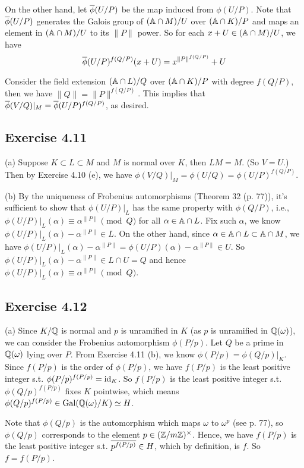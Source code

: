 \documentclass[../Marcus.tex]{subfiles}
\begin{document}
On the other hand, let $\ovl{\phi}(U/P)$ be the map induced from $\phi(U/P)$. Note that $\ovl{\phi}(U/P)$ generates the Galois group of $(\AA \cap M)/U$ over $(\AA \cap K)/P$ and maps an element in $(\AA \cap M)/U$ to its $\|P\|$ power. So for each $x+U \in (\AA \cap M)/U$, we have
$$
\ovl{\phi}(U/P)^{f(Q/P)}(x+U)=x^{\|P\|^{f(Q/P)}}+U
$$

Consider the field extension $(\AA \cap L)/Q$ over $(\AA \cap K)/P$ with degree $f(Q/P)$, then we have $\|Q\|=\|P\|^{f(Q/P)}$. This implies that $\ovl{\phi}(V/Q)|_M=\ovl{\phi}(U/P)^{f(Q/P)}$, as desired.

\subsection*{Exercise 4.11}

(a) Suppose $K\subset L\subset M$ and $M$ is normal over $K$, then $LM=M$. (So $V=U$.) Then by Exercise 4.10 (e), we have $\phi(V/Q)|_M=\phi(U/Q)=\phi(U/P)^{f(Q/P)}$.

(b) By the uniqueness of Frobenius automorphisms (Theorem 32 (p. 77)), it's sufficient to show that $\phi(U/P)|_L$ has the same property with $\phi(Q/P)$, i.e., $\phi(U/P)|_L(\alpha)\equiv\alpha^{\|P\|} \pmod{Q}$ for all $\alpha\in \AA \cap L$. Fix such $\alpha$, we know $\phi(U/P)|_L(\alpha)-\alpha^{\|P\|}\in L$. On the other hand, since $\alpha\in \AA \cap L \subset \AA \cap M$, we have $\phi(U/P)|_L(\alpha)-\alpha^{\|P\|}=\phi(U/P)(\alpha)-\alpha^{\|P\|}\in U$. So $\phi(U/P)|_L(\alpha)-\alpha^{\|P\|} \in L\cap U=Q$ and hence $\phi(U/P)|_L(\alpha)\equiv\alpha^{\|P\|} \pmod{Q}$.

\subsection*{Exercise 4.12}

(a) Since $K/\QQ$ is normal and $p$ is unramified in $K$ (as $p$ is unramified in $\QQ(\omega)$), we can consider the Frobenius automorphism $\phi(P/p)$. Let $Q$ be a prime in $\QQ(\omega)$ lying over $P$. From Exercise 4.11 (b), we know $\phi(P/p)=\phi(Q/p)|_K$. Since $f(P/p)$ is the order of $\phi(P/p)$, we have $f(P/p)$ is the least positive integer s.t. $\phi(P/p)^{f(P/p)}=\id_K$. So $f(P/p)$ is the least positive integer s.t. $\phi(Q/p)^{f(P/p)}$ fixes $K$ pointwise, which means $\phi(Q/p)^{f(P/p)} \in \Gal(\QQ(\omega)/K) \simeq H$.

Note that $\phi(Q/p)$ is the automorphism which maps $\omega$ to $\omega^p$ (see p. 77), so $\phi(Q/p)$ corresponds to the element $p\in(\ZZ/m\ZZ)^\times$. Hence, we have $f(P/p)$ is the least positive integer s.t. $\ovl{p^{f(P/p)}}\in H$, which by definition, is $f$. So $f=f(P/p)$.
\end{document}
